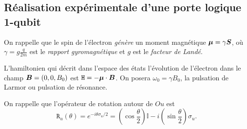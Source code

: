 \subsection{Réalisation expérimentale d'une porte logique 1-qubit}

On rappelle que le spin de l'électron \emph{génère} un moment magnétique
$\boldsymbol{\mu}=\gamma\boldsymbol{S}$, où $\gamma=g\frac{q}{2m}$ est le \emph{rapport
gyromagnétique} et $g$ est le \emph{facteur de Landé}.

L'hamiltonien qui décrit dans l'espace des états l'évolution de l'électron dans
le champ $\boldsymbol{B}=(0,0,B_0)$ est $\mathtt{H}=-\boldsymbol{\mu}\cdot\boldsymbol{B}$. On posera
$\omega_0=\gamma B_0$, la pulsation de Larmor ou pulsation de résonance.

On rappelle que l'opérateur de rotation autour de $Ou$ est
\begin{equation}
\mathtt{R}_u(\theta)= e^{-i\theta\sigma_{u}/2} =(\cos\frac{\theta}{2})\mathbb{I}
-i(\sin\frac{\theta}{2})\sigma_{u}.
\end{equation}
